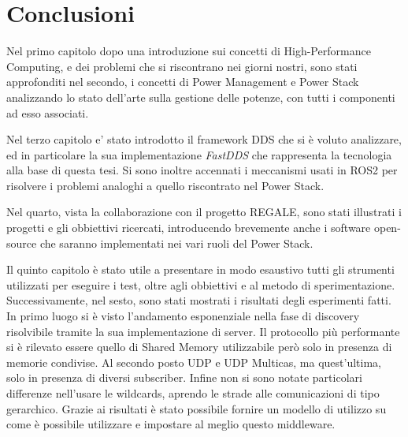 \chapter{Conclusioni}

Nel primo capitolo dopo una introduzione sui concetti di High-Performance Computing, e dei problemi che si riscontrano nei giorni nostri, sono stati approfonditi nel secondo, i concetti di Power Management e Power Stack analizzando lo stato dell'arte sulla gestione delle potenze, con tutti i componenti ad esso associati. 

Nel terzo capitolo e' stato introdotto il framework DDS che si è voluto analizzare, ed in particolare la sua implementazione \emph{FastDDS} che rappresenta la tecnologia alla base di questa tesi. Si sono inoltre accennati i meccanismi usati in ROS2 per risolvere i problemi analoghi a quello riscontrato nel Power Stack.

Nel quarto, vista la collaborazione con il progetto REGALE, sono stati illustrati i progetti e gli obbiettivi ricercati, introducendo brevemente anche i software open-source che saranno implementati nei vari ruoli del Power Stack. 

Il quinto capitolo è stato utile a presentare in modo esaustivo tutti gli strumenti utilizzati per eseguire i test, oltre agli obbiettivi e al metodo di sperimentazione. Successivamente, nel sesto, sono stati mostrati i risultati degli esperimenti fatti. In primo luogo si è visto l'andamento esponenziale nella fase di discovery risolvibile tramite la sua implementazione di server. Il protocollo più performante si è rilevato essere quello di Shared Memory utilizzabile però solo in presenza di memorie condivise. Al secondo posto UDP e UDP Multicas, ma quest'ultima, solo in presenza di diversi subscriber. Infine non si sono notate particolari differenze nell'usare le wildcards, aprendo le strade alle comunicazioni di tipo gerarchico.
Grazie ai risultati è stato possibile fornire un modello di utilizzo su come è possibile utilizzare e impostare al meglio questo middleware.

